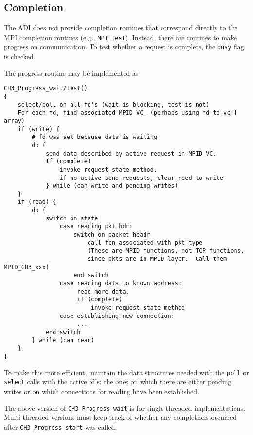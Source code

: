 \documentclass{article}
\def\mpids#1#2{\code{#2}\index{#1!#2}}
\def\code{\begingroup\makeustext\eatcode}
\def\eatcode#1{\texttt{#1}\endgroup}
\begin{document}
\subsection{Completion}
The ADI does not provide completion routines that correspond directly
to the MPI completion routines (e.g., \code{MPI_Test}).  Instead,
there are routines to make progress on communication.  To test whether
a request is complete, the \mpids{MPID_Request}{busy} flag is checked.

The progress routine may be implemented as
\begin{verbatim}
CH3_Progress_wait/test()
{
    select/poll on all fd's (wait is blocking, test is not)
    For each fd, find associated MPID_VC. (perhaps using fd_to_vc[] array)
    if (write) {
        # fd was set because data is waiting
        do {
            send data described by active request in MPID_VC.  
            If (complete)
                invoke request_state_method.
                if no active send requests, clear need-to-write
            } while (can write and pending writes)
    }
    if (read) {
        do {
            switch on state
                case reading pkt hdr: 
                    switch on packet headr
                        call fcn associated with pkt type
                        (These are MPID functions, not TCP functions, 
                        since pkts are in MPID layer.  Call them MPID_CH3_xxx) 
                    end switch
                case reading data to known address:
                     read more data.
                     if (complete)
                         invoke request_state_method
                case establishing new connection:
                     ...
            end switch
        } while (can read)
    }
}
\end{verbatim}
To make this more efficient, maintain the data structures needed with the
\code{poll} or \code{select} calls with the active fd's: the ones on which
there are either pending writes or on which connections for reading have been
established.  

The above version of \code{CH3_Progress_wait} is for single-threaded
implementations.  Multi-threaded versions must keep track of whether any
completions occurred after \code{CH3_Progress_start} was called.


\end{document}
